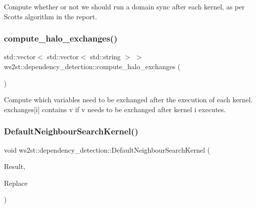 Compute whether or not we should run a domain sync after each kernel, as per Scott\textquotesingle{}s algorithm in the report. 

\mbox{\label{namespacews2st_1_1dependency__detection_a2b9570e91f83523fedfd436f165b8295}} 
\subsubsection{\texorpdfstring{compute\+\_\+halo\+\_\+exchanges()}{compute\_halo\_exchanges()}}
{\footnotesize\ttfamily std\+::vector$<$ std\+::vector$<$ std\+::string $>$ $>$ ws2st\+::dependency\+\_\+detection\+::compute\+\_\+halo\+\_\+exchanges (\begin{DoxyParamCaption}{ }\end{DoxyParamCaption})}



Compute which variables need to be exchanged after the execution of each kernel. exchanges\mbox{[}i\mbox{]} contains v if v needs to be exchanged after kernel i executes. 

\mbox{\label{namespacews2st_1_1dependency__detection_af3f0299c83e5f9608d8086fe50abf81c}} 
\subsubsection{\texorpdfstring{Default\+Neighbour\+Search\+Kernel()}{DefaultNeighbourSearchKernel()}}
{\footnotesize\ttfamily void ws2st\+::dependency\+\_\+detection\+::\+Default\+Neighbour\+Search\+Kernel (\begin{DoxyParamCaption}\item[{const Match\+Finder\+::\+Match\+Result \&}]{Result,  }\item[{Replacements \&}]{Replace }\end{DoxyParamCaption})}


